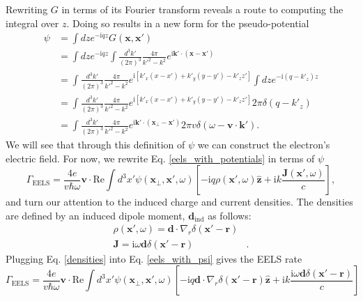 \documentclass [11pt, proquest] {uwthesis}[2016/11/22]
\begin{document}
Rewriting $G$ in terms of its Fourier transform reveals a route to computing the integral over $z$. Doing so results in a new form for the pseudo-potential
\begin{equation}
\begin{aligned}
\psi &= \int dz e^{-\textrm{i}qz} G(\textbf{x},\textbf{x}')\\ 
&= \int dz e^{-\textrm{i}qz} \int \frac{d^3k'}{(2\pi)^3} \frac{4\pi}{k'^2 - k^2} e^{\textrm{i}\textbf{k}'\cdot(\textbf{x}-\textbf{x}')}\\
&= \int \frac{d^3k'}{(2\pi)^3} \frac{4\pi}{k'^2 - k^2} e^{\textrm{i}[k'_x(x-x')+k'_y(y-y')-k'_zz']} \int dz e^{-\textrm{i}(q-k'_z)z}\\
&= \int \frac{d^3k'}{(2\pi)^3} \frac{4\pi}{k'^2 - k^2} e^{\textrm{i}[k'_x(x-x')+k'_y(y-y')-k'_zz']} 2\pi\delta(q-k'_z)\\
&= \int \frac{d^3k'}{(2\pi)^3} \frac{4\pi}{k'^2 - k^2} e^{\textrm{i}\textbf{k}'\cdot(\textbf{x}_{\perp}-\textbf{x}')} 2\pi v \delta(\omega-\textbf{v}\cdot\textbf{k}').
\label{psi_k_space}
\end{aligned}
\end{equation}
We will see that through this definition of $\psi$ we can construct the electron's electric field. For now, we rewrite Eq. \ref{eels_with_potentials} in terms of $\psi$
\begin{equation}
\Gamma_{\textrm{EELS}} = \frac{4e}{v\hbar\omega}\textbf{v}\cdot\textrm{Re}\int d^3x' \psi(\textbf{x}_{\perp},\textbf{x}',\omega) \left[-\textrm{i}q\rho(\textbf{x}',\omega)\hat{\textbf{z}} + \textrm{i}k\frac{\textbf{J}(\textbf{x}',\omega)}{c}\right],
\label{eels_with_psi}
\end{equation}
and turn our attention to the induced charge and current densities. The densities are defined by an induced dipole moment, $\textbf{d}_{\textrm{ind}}$ as follows:
\begin{equation}
\begin{aligned}
\rho(\textbf{x}',\omega) = \textbf{d}\cdot\nabla_{r}\delta(\textbf{x}'-\textbf{r})&\\
\textbf{J} = \textrm{i}\omega\textbf{d}\delta(\textbf{x}'-\textbf{r})&.
\label{densities}
\end{aligned}
\end{equation} 
Plugging Eq. \ref{densities} into Eq. \ref{eels_with_psi} gives the EELS rate
\begin{equation}
\Gamma_{\textrm{EELS}} = \frac{4e}{v\hbar\omega}\textbf{v}\cdot\textrm{Re}\int d^3x' \psi(\textbf{x}_{\perp},\textbf{x}',\omega) \left[-\textrm{i}q \textbf{d}\cdot\nabla_{r}\delta(\textbf{x}'-\textbf{r})\hat{\textbf{z}} + \textrm{i}k\frac{\textrm{i}\omega\textbf{d}\delta(\textbf{x}'-\textbf{r})}{c}\right]
\label{eels_with_densities}
\end{equation}
\end{document}
